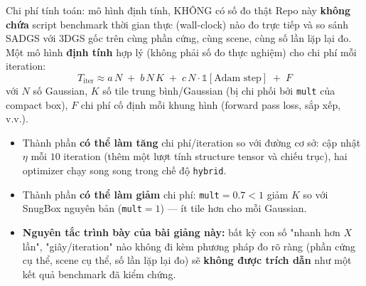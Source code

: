 \begin{frame}{Chi phí tính toán: mô hình định tính, KHÔNG có số đo thật}
\scriptsize
Repo này \textbf{không chứa} script benchmark thời gian thực (wall-clock) nào đo trực tiếp và so sánh SADGS với 3DGS
gốc trên cùng phần cứng, cùng scene, cùng số lần lặp lại đo. Một mô hình \textbf{định tính} hợp lý (không phải số đo
thực nghiệm) cho chi phí mỗi iteration:
\[
T_{\text{iter}} \approx a\,N \;+\; b\,N\,K \;+\; c\,N\cdot\mathbb{1}[\text{Adam step}] \;+\; F
\]
với $N$ số Gaussian, $K$ số tile trung bình/Gaussian (bị chi phối bởi \texttt{mult} của compact box), $F$ chi phí cố
định mỗi khung hình (forward pass loss, sắp xếp, v.v.).
\begin{itemize}\itemsep1pt
    \item Thành phần \textbf{có thể làm tăng} chi phí/iteration so với đường cơ sở: cập nhật $\eta$ mỗi $10$ iteration
    (thêm một lượt tính structure tensor và chiếu trục), hai optimizer chạy song song trong chế độ \texttt{hybrid}.
    \item Thành phần \textbf{có thể làm giảm} chi phí: \texttt{mult}$=0.7<1$ giảm $K$ so với SnugBox nguyên bản
    (\texttt{mult}$=1$) --- ít tile hơn cho mỗi Gaussian.
    \item \textbf{Nguyên tắc trình bày của bài giảng này:} bất kỳ con số "nhanh hơn $X$ lần", "giây/iteration" nào không
    đi kèm phương pháp đo rõ ràng (phần cứng cụ thể, scene cụ thể, số lần lặp lại đo) sẽ \textbf{không được trích dẫn}
    như một kết quả benchmark đã kiểm chứng.
\end{itemize}
\end{frame}


